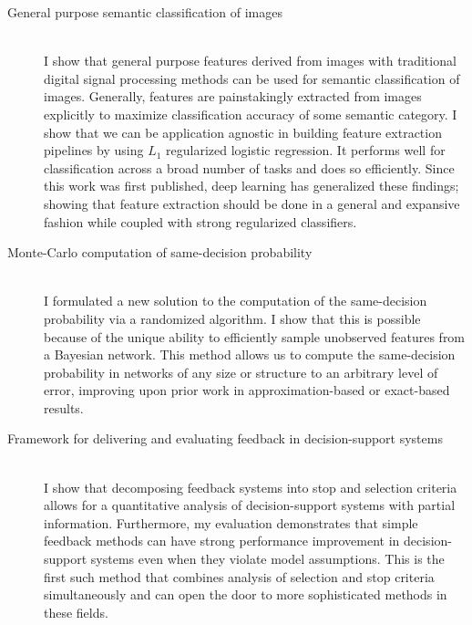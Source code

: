 \begin{description}
	\item[General purpose semantic classification of images] \hfill \\
	I show that general purpose features derived from images with traditional digital signal processing methods can be used for semantic classification of images. Generally, features are painstakingly extracted from images explicitly to maximize classification accuracy of some semantic category. I show that we can be application agnostic in building feature extraction pipelines by using $L_1$ regularized logistic regression. It performs well for classification across a broad number of tasks and does so efficiently. Since this work was first published, deep learning has generalized these findings; showing that feature extraction should be done in a general and expansive fashion while coupled with strong regularized classifiers.
	
	\item[Monte-Carlo computation of same-decision probability] \hfill \\
	I formulated a new solution to the computation of the same-decision probability via a randomized algorithm. I show that this is possible because of the unique ability to efficiently sample unobserved features from a Bayesian network. This method allows us to compute the same-decision probability in networks of any size or structure to an arbitrary level of error, improving upon prior work in approximation-based or exact-based results.
	
	\item[Framework for delivering and evaluating feedback in decision-support systems] \hfill \\
	I show that decomposing feedback systems into stop and selection criteria allows for a quantitative analysis of decision-support systems with partial information. Furthermore, my evaluation demonstrates that simple feedback methods can have strong performance improvement in decision-support systems even when they violate model assumptions. This is the first such method that combines analysis of selection and stop criteria simultaneously and can open the door to more sophisticated methods in these fields.
\end{description}
